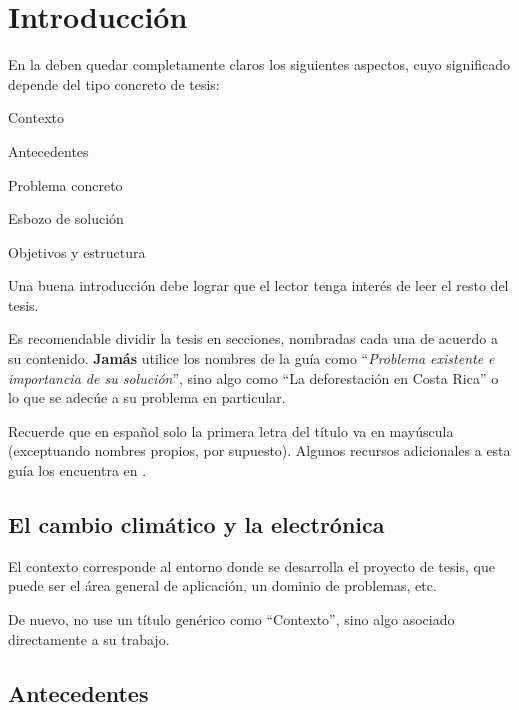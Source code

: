 
\chapter{Introducción}
\label{chp:intro}

En la  deben quedar completamente claros los siguientes
aspectos, cuyo significado depende del tipo concreto de tesis:

\begin{compactitem}
\item Contexto
\item Antecedentes
\item Problema concreto
\item Esbozo de solución
\item Objetivos y estructura
\end{compactitem}

Una buena introducción debe lograr que el lector tenga interés de leer el resto
del tesis.

Es recomendable dividir la tesis en secciones, nombradas cada una de acuerdo a
su contenido. \textbf{Jamás} utilice los nombres de la guía como
``\emph{Problema existente e importancia de su solución}'', sino algo como ``La
deforestación en Costa Rica'' o lo que se adecúe a su problema en particular.

Recuerde que en español solo la primera letra del título va en mayúscula
(exceptuando nombres propios, por supuesto).
%
Algunos recursos adicionales a esta guía los encuentra en \cite{AlvaradoWeb}.


\section{El cambio climático y la electrónica}
\label{sec:contexto}

El contexto corresponde al entorno donde se desarrolla el proyecto de
tesis, que puede ser el área general de aplicación, un dominio de
problemas, etc.

De nuevo, no use un título genérico como ``Contexto'', sino algo
asociado directamente a su trabajo.


\section{Antecedentes}


